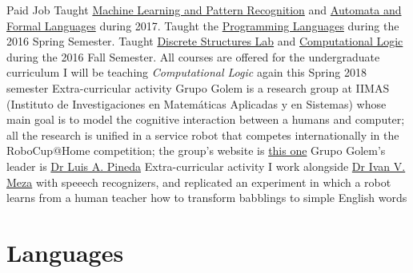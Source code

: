 \documentclass[8pt,a4paper,sans]{moderncv} %
\begin{document}
        {Paid Job}
        {Taught \href{http://turing.iimas.unam.mx/~ivanvladimir/page/curso_rpyaa}{Machine Learning and Pattern Recognition} and \href{https://sites.google.com/site/automataslengformales20172/}{Automata and Formal Languages} during 2017. Taught the \href{https://sites.google.com/site/lengprog20162/}{Programming Languages} during the 2016 Spring Semester. Taught \href{https://sites.google.com/a/ciencias.unam.mx/estructuras-discretas/home}{Discrete Structures Lab} and \href{https://sites.google.com/site/logcompunam20171/home}{Computational Logic} during the 2016 Fall Semester. All courses are offered for the undergraduate curriculum}
        {I will be teaching \emph{Computational Logic} again this Spring 2018 semester}{}{}
        {Extra-curricular activity}
        {Grupo Golem is a research group at IIMAS (Instituto de Investigaciones en Matem\'{a}ticas Aplicadas y en Sistemas) whose main goal is to model the cognitive interaction between a humans and computer; all the research is unified in a service robot that competes internationally in the RoboCup@Home competition; the group's website is \href{http://golem.iimas.unam.mx/home.php?lang=en&sec=home}{this one}}
        {Grupo Golem's leader is \href{http://turing.iimas.unam.mx/~luis/}{Dr Luis A. Pineda}}{}{}
        {Extra-curricular activity}
        {I work alongside \href{http://turing.iimas.unam.mx/~ivanvladimir/}{Dr Ivan V. Meza} with speeech recognizers, and replicated an experiment in which a robot learns from a human teacher how to transform babblings to simple English words}
        {}{}{}



\section{Languages}


\end{document}

